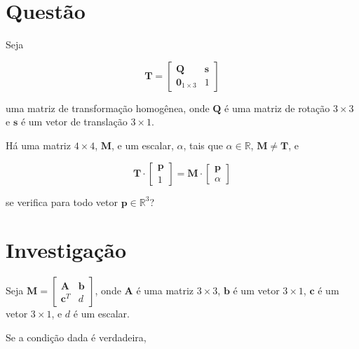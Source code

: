 \documentclass[a4paper]{article}
\begin{document}
\section{Questão}

Seja

\begin{equation}
    \mathbf{T} = \begin{bmatrix}
        \mathbf{Q} & \mathbf{s} \\
        \mathbf{0}_{1\times 3} & 1
    \end{bmatrix}
\end{equation}

uma matriz de transformação homogênea, onde $\mathbf{Q}$ é uma matriz de rotação $3 \times 3$ e $\mathbf{s}$ é um vetor de translação $3 \times 1$.

Há uma matriz $4 \times 4$, $\mathbf{M}$, e um escalar, $\alpha$, tais que $\alpha \in \mathbb{R}$, $\mathbf{M} \neq \mathbf{T}$, e

\begin{equation}
    \mathbf{T}\cdot\begin{bmatrix}\mathbf{p} \\ 1\end{bmatrix} = \mathbf{M}\cdot\begin{bmatrix}\mathbf{p} \\ \alpha\end{bmatrix}
\end{equation}

se verifica para todo vetor $\mathbf{p} \in \mathbb{R}^3$?

\section{Investigação}

Seja $\mathbf{M} = \begin{bmatrix}
    \mathbf{A} & \mathbf{b} \\
    \mathbf{c}^T & d
\end{bmatrix}$, onde $\mathbf{A}$ é uma matriz $3 \times 3$, $\mathbf{b}$ é um vetor $3 \times 1$, $\mathbf{c}$ é um vetor $3 \times 1$, e $d$ é um escalar.

Se a condição dada é verdadeira,
\end{document}
